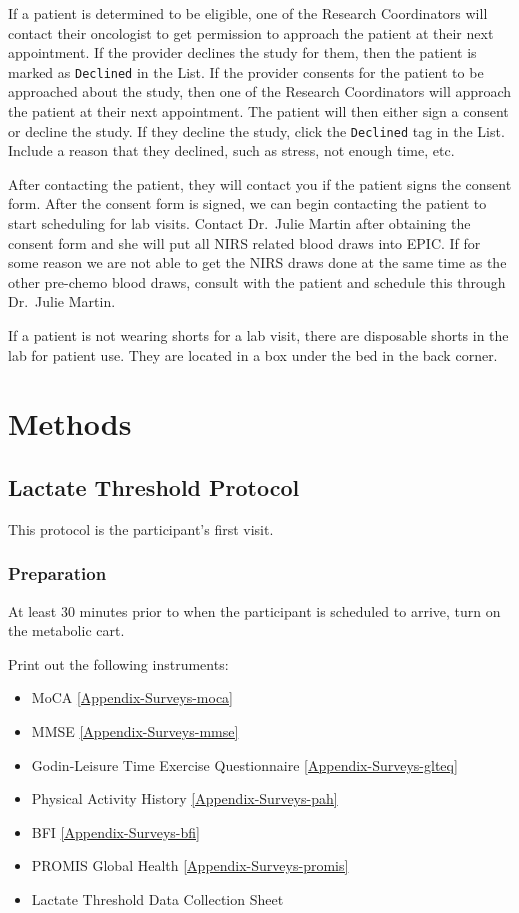 \documentclass[
]{book}
\providecommand{\tightlist}{%
  \setlength{\itemsep}{0pt}\setlength{\parskip}{0pt}}
\begin{document}
If a patient is determined to be eligible, one of the Research Coordinators will contact their oncologist to get permission to approach the patient at their next appointment. If the provider declines the study for them, then the patient is marked as \texttt{Declined} in the List. If the provider consents for the patient to be approached about the study, then one of the Research Coordinators will approach the patient at their next appointment. The patient will then either sign a consent or decline the study. If they decline the study, click the \texttt{Declined} tag in the List. Include a reason that they declined, such as stress, not enough time, etc.

After contacting the patient, they will contact you if the patient signs the consent form. After the consent form is signed, we can begin contacting the patient to start scheduling for lab visits. Contact Dr.~Julie Martin after obtaining the consent form and she will put all NIRS related blood draws into EPIC. If for some reason we are not able to get the NIRS draws done at the same time as the other pre-chemo blood draws, consult with the patient and schedule this through Dr.~Julie Martin.

If a patient is not wearing shorts for a lab visit, there are disposable shorts in the lab for patient use. They are located in a box under the bed in the back corner.

\hypertarget{Methods}{%
\chapter{Methods}\label{Methods}}

\hypertarget{Methods-LT}{%
\section{Lactate Threshold Protocol}\label{Methods-LT}}

This protocol is the participant's first visit.

\hypertarget{Methods-LT-prep}{%
\subsection{Preparation}\label{Methods-LT-prep}}

At least 30 minutes prior to when the participant is scheduled to arrive, turn on the metabolic cart.

Print out the following instruments:

\begin{itemize}
\tightlist
\item
  MoCA \ref{Appendix-Surveys-moca}
\item
  MMSE \ref{Appendix-Surveys-mmse}
\item
  Godin-Leisure Time Exercise Questionnaire \ref{Appendix-Surveys-glteq}
\item
  Physical Activity History \ref{Appendix-Surveys-pah}
\item
  BFI \ref{Appendix-Surveys-bfi}
\item
  PROMIS Global Health \ref{Appendix-Surveys-promis}
\item
  Lactate Threshold Data Collection Sheet
\end{itemize}
\end{document}
